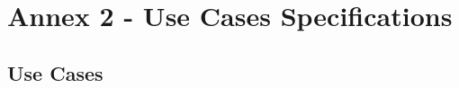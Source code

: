 %

\chapter{Annex 2 - Use Cases Specifications}
\label{ann:use_cases_annex}

\section*{Use Cases}


